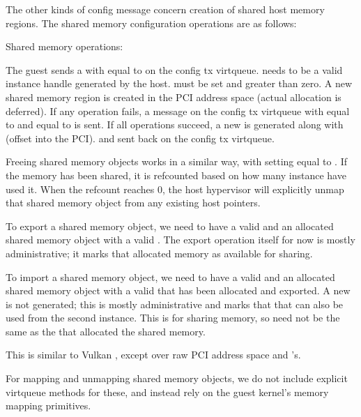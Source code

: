 The other kinds of config message concern creation of shared host memory regions.
The shared memory configuration operations are as follows:

Shared memory operations:

The guest sends a 
with  equal to 
on the config tx virtqueue.
 needs to be a valid instance handle generated by the host.
 must be set and greater than zero.
A new shared memory region is created in the PCI address space (actual allocation is deferred).
If any operation fails, a message on the config tx virtqueue
with  equal to 
and  equal to 
is sent.
If all operations succeed,
a new  is generated along with  (offset into the PCI).
and sent back on the config tx virtqueue.

Freeing shared memory objects works in a similar way,
with setting  equal to .
If the memory has been shared,
it is refcounted based on how many instance have used it.
When the refcount reaches 0,
the host hypervisor will explicitly unmap that shared memory object
from any existing host pointers.

To export a shared memory object, we need to have a valid 
and an allocated shared memory object with a valid .
The export operation itself for now is mostly administrative;
it marks that allocated memory as available for sharing.

To import a shared memory object, we need to have a valid 
and an allocated shared memory object with a valid 
that has been allocated and exported. A new  is not generated;
this is mostly administrative and marks that that 
can also be used from the second instance.
This is for sharing memory, so  need not
be the same as the  that allocated the shared memory.

This is similar to Vulkan ,
except over raw PCI address space and 's.

For mapping and unmapping shared memory objects,
we do not include explicit virtqueue methods for these,
and instead rely on the guest kernel's memory mapping primitives.

